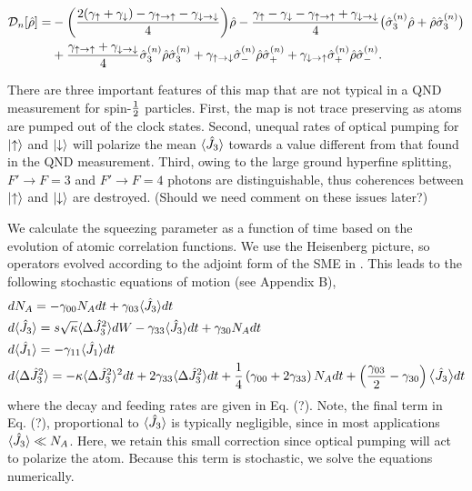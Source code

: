 \documentclass[preprint,aps,pra,onecolumn]{revtex4-1} %
\newcommand{\jz}{\hat{J}_3}
\newcommand{\gammauu}{\gamma_{\uparrow \rightarrow \uparrow}}
\newcommand{\gammadd}{\gamma_{\downarrow \rightarrow \downarrow}}
\newcommand{\gammaud}{\gamma_{\uparrow \rightarrow \downarrow}}
\newcommand{\gammadu}{\gamma_{\downarrow \rightarrow \uparrow}}
\newcommand{\gammau}{\gamma_{\uparrow}}
\newcommand{\gammad}{\gamma_{\downarrow}}
\newcommand{\half}{\smallfrac{1}{2}}
\newcommand{\comment}[1]{{\color{Maroon} #1}}
\begin{document}
	\begin{align} \label{Eq::OpticalPumpingMapSchr}
		\mathcal{D}_n [\hat{\rho}] 
				=& - \bigg( \frac{2(\gammau+ \gammad) - \gammauu - \gammadd}{4} \bigg) \hat{\rho} - \frac{ \gammau - \gammad - \gammauu + \gammadd }{4} \big( \hat{\sigma}_3^{(n)} \hat{\rho}+ \hat{\rho} \hat{\sigma}_3^{(n)} \big) \nn \\
		&+ \frac{\gammauu+\gammadd}{4} \hat{\sigma}_ 3^{(n)}\hat{\rho} \hat{\sigma}_3^{(n)} + \gammaud  \hat{\sigma}_-^{(n)} \hat{\rho} \hat{\sigma}_+^{(n)} + \gammadu  \hat{\sigma}_+^{(n)} \hat{\rho} \hat{\sigma}_- ^{(n)}.   
	\end{align} 
	
There are three important features of this map that are not typical in a QND measurement for spin-$\half$ particles.  
First, the map is not trace preserving as atoms are pumped out of the clock states. 
Second, unequal rates of optical pumping for $\lvert{\uparrow}\rangle$ and $\lvert{\downarrow}\rangle$ will polarize the mean $\expt{\jz}$ towards a value different from that found in the QND measurement. 
Third, owing to the large ground hyperfine splitting, $F' \rightarrow F=3$ and $F' \rightarrow F=4$ photons are distinguishable, thus coherences between $\lvert{\uparrow}\rangle$ and $\lvert{\downarrow}\rangle$ are destroyed. \comment{(Should we need comment on these issues  later?)}

We calculate the squeezing parameter as a function of time based on the evolution of atomic correlation functions.  We use the Heisenberg picture, so operators evolved according to the adjoint form of the SME in .  This leads to the following stochastic equations of motion (see Appendix B),
\begin{align}
&d N_A = -\gamma_{00} N_A  dt +  \gamma_{03} \langle{\hat{J}_3}\rangle dt \\
&d \langle{\hat{J}_3}\rangle  = s\sqrt{\kappa}\langle{\Delta \hat{J}_3^2}\rangle dW -\gamma_{33} \langle{\hat{J}_3}\rangle dt +\gamma_{30} N_A dt   \\
&d \langle{\hat{J}_1}\rangle  = -\gamma_{11} \langle{\hat{J}_1}\rangle dt  \\
&d \langle{\Delta \hat{J}_3^2}\rangle  = - \kappa \langle{\Delta \hat{J}_3^2}\rangle^2 dt + 2 \gamma_{33} \langle{\Delta \hat{J}_3^2}\rangle dt + \frac{1}{4}\left(\gamma_{00}+2\gamma_{33} \right) N_A dt + \left(\frac{\gamma_{03}}{2}-\gamma_{30}\right) \big\langle \hat{J}_3 \big\rangle dt    
\end{align}
where the decay and feeding rates are given in Eq. (?).  
Note, the final term in Eq. (?), proportional to $\langle{\hat{J}_3}\rangle$ is typically negligible, since in most applications $\langle{\hat{J}_3}\rangle \ll N_A$.  
Here, we retain this small correction since optical pumping will act to polarize the atom.  
Because this term is stochastic, we  solve the equations numerically. 
\end{document}
